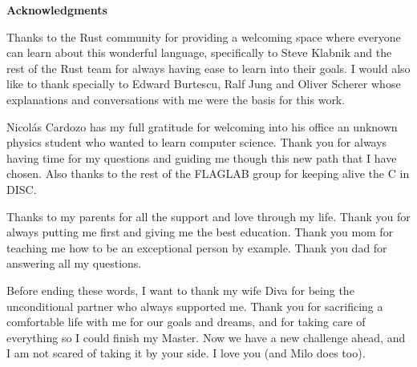 \clearemptydoublepage
{}
{}

\vspace*{2cm}

\begin{center}
{\Large \textbf{Acknowledgments}}
\end{center}

\vspace{1cm}

Thanks to the Rust community for providing a welcoming space where everyone can
learn about this wonderful language, specifically to Steve Klabnik and the rest
of the Rust team for always having ease to learn into their goals. I would also
like to thank specially to Edward Burtescu, Ralf Jung and Oliver Scherer whose
explanations and conversations with me were the basis for this work.

Nicolás Cardozo has my full gratitude for welcoming into his office an unknown
physics student who wanted to learn computer science. Thank you for always
having time for my questions and guiding me though this new path that I have
chosen. Also thanks to the rest of the FLAGLAB group for keeping alive the C in
DISC.

Thanks to my parents for all the support and love through my life. Thank you
for always putting me first and giving me the best education. Thank you mom for
teaching me how to be an exceptional person by example. Thank you dad for
answering all my questions.

Before ending these words, I want to thank my wife Diva for being the
unconditional partner who always supported me. Thank you for sacrificing a
comfortable life with me for our goals and dreams, and for taking care of
everything so I could finish my Master. Now we have a new challenge ahead, and
I am not scared of taking it by your side. I love you (and Milo does too).
